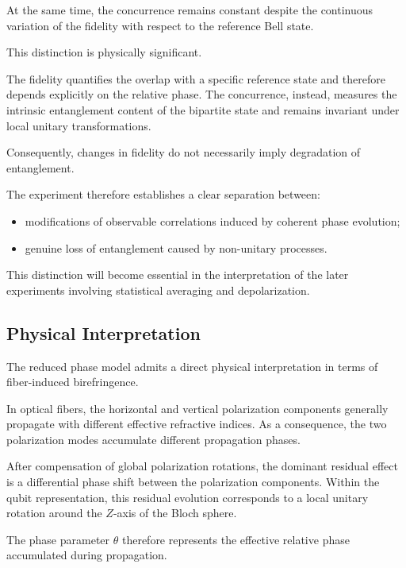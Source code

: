 At the same time, the concurrence remains constant despite the continuous variation of the fidelity with respect to the reference Bell state.

This distinction is physically significant.

The fidelity quantifies the overlap with a specific reference state and therefore depends explicitly on the relative phase. The concurrence, instead, measures the intrinsic entanglement content of the bipartite state and remains invariant under local unitary transformations.

Consequently, changes in fidelity do not necessarily imply degradation of entanglement.

The experiment therefore establishes a clear separation between:

\begin{itemize}
    \item modifications of observable correlations induced by coherent phase evolution;
    \item genuine loss of entanglement caused by non-unitary processes.
\end{itemize}

This distinction will become essential in the interpretation of the later experiments involving statistical averaging and depolarization.


\subsection{Physical Interpretation}

The reduced phase model admits a direct physical interpretation in terms of fiber-induced birefringence.

In optical fibers, the horizontal and vertical polarization components generally propagate with different effective refractive indices. As a consequence, the two polarization modes accumulate different propagation phases.

After compensation of global polarization rotations, the dominant residual effect is a differential phase shift between the polarization components. Within the qubit representation, this residual evolution corresponds to a local unitary rotation around the \(Z\)-axis of the Bloch sphere.

The phase parameter \( \theta \) therefore represents the effective relative phase accumulated during propagation.

